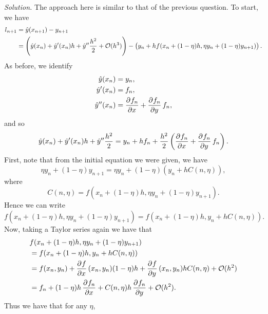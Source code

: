 \documentclass{article}
\newcommand{\Oh}{\mathcal{O}}
\begin{document}
\textit{Solution.}
The approach here is similar to that of the previous question. To start, we have
%
\begin{align*}
    l_{n + 1}
        &= \hat{y}(x_{n + 1}) - y_{n + 1} \\
        &= \del{\hat{y}(x_{n}) + \hat{y}^\prime(x_n)h + \hat{y}^{\prime \prime} \frac{h^2}{2} + \Oh(h^3)}
            - \del{y_{n} + h f(x_n + (1 - \eta) h, \eta y_n + (1 - \eta) y_{n + 1})}
            .
\end{align*}
%
As before, we identify
%
\begin{align*}
    \hat{y}(x_n) &= y_n,
    \\
    \hat{y}^\prime(x_n) &= f_n,
    \\
    \hat{y}^{\prime \prime}(x_n)
        &= \dpd{f_n}{x}
        + \dpd{f_n}{y} f_n
        ,
\end{align*}
%
and so
%
\begin{equation*}
    \hat{y}(x_{n}) + \hat{y}^\prime(x_n)h + \hat{y}^{\prime \prime} \frac{h^2}{2}
    = y_n + h f_n + \frac{h^2}{2} \del{\dpd{f_n}{x} + \dpd{f_n}{y} f_n}
    .
\end{equation*}
%
First, note that from the initial equation we were given, we have
%
\begin{equation*}
    \eta y_n + (1 - \eta) y_{n + 1}
    = \eta y_n + (1 - \eta) (y_n + h C(n, \eta))
    ,
\end{equation*}
%
where
%
\begin{equation*}
    C(n, \eta) = f(x_n + (1 - \eta) h, \eta y_n + (1 - \eta) y_{n + 1})
    .
\end{equation*}
%
Hence we can write
%
\begin{equation*}
    f(x_n + (1 - \eta) h, \eta y_n + (1 - \eta) y_{n + 1})
    = f(x_n + (1 - \eta) h, y_n + h C(n, \eta))
    .
\end{equation*}
%
Now, taking a Taylor series again we have that
%
\begin{align*}
    &f(x_n + (1 - \eta) h, \eta y_n + (1 - \eta) y_{n + 1})
    \\
    &= f(x_n + (1 - \eta) h, y_n + h C(n, \eta))
    \\
    &= f(x_n, y_n)
        + \dpd{f}{x} (x_n, y_n) (1 - \eta) h
        + \dpd{f}{y} (x_n, y_n) h C(n, \eta)
        + \Oh(h^2)
        \\
    &= f_n
        + (1 - \eta) h \dpd{f_n}{x}
        + C(n, \eta) h \dpd{f_n}{y}
        + \Oh(h^2)
    .
\end{align*}
%
Thus we have that for any $\eta$,
%
\end{document}
